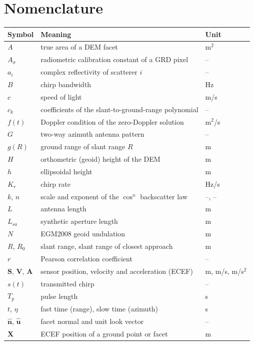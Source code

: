 \chapter*{Nomenclature}
\thispagestyle{plain}

\begin{longtable}{@{}p{30mm} p{90mm} l@{}}
\toprule
Symbol & Meaning & Unit \\
\midrule
\endhead
$A$ & true area of a DEM facet & m$^2$ \\
$A_\sigma$ & radiometric calibration constant of a GRD pixel & -- \\
$a_i$ & complex reflectivity of scatterer $i$ & -- \\
$B$ & chirp bandwidth & Hz \\
$c$ & speed of light & m/s \\
$c_k$ & coefficients of the slant-to-ground-range polynomial & -- \\
$f(t)$ & Doppler condition of the zero-Doppler solution & m$^2$/s \\
$G$ & two-way azimuth antenna pattern & -- \\
$g(R)$ & ground range of slant range $R$ & m \\
$H$ & orthometric (geoid) height of the DEM & m \\
$h$ & ellipsoidal height & m \\
$K_r$ & chirp rate & Hz/s \\
$k$, $n$ & scale and exponent of the $\cos^n$ backscatter law & --, -- \\
$L$ & antenna length & m \\
$L_{sa}$ & synthetic aperture length & m \\
$N$ & EGM2008 geoid undulation & m \\
$R$, $R_0$ & slant range, slant range of closest approach & m \\
$r$ & Pearson correlation coefficient & -- \\
$\mathbf{S}$, $\mathbf{V}$, $\mathbf{A}$ & sensor position, velocity and acceleration (ECEF) & m, m/s, m/s$^2$ \\
$s(t)$ & transmitted chirp & -- \\
$T_p$ & pulse length & s \\
$t$, $\eta$ & fast time (range), slow time (azimuth) & s \\
$\hat{\mathbf{n}}$, $\hat{\mathbf{u}}$ & facet normal and unit look vector & -- \\
$\mathbf{X}$ & ECEF position of a ground point or facet & m \\

\end{longtable}

